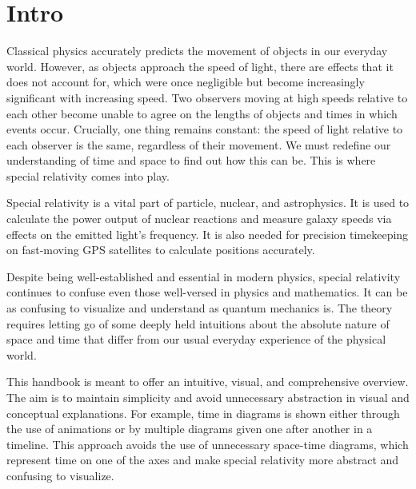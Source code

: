 \frontmatter
\chapter{Intro}

Classical physics accurately predicts the movement of objects in our everyday world. However, as objects approach the speed of light, there are effects that it does not account for, which were once negligible but become increasingly significant with increasing speed. Two observers moving at high speeds relative to each other become unable to agree on the lengths of objects and times in which events occur. Crucially, one thing remains constant: the speed of light relative to each observer is the same, regardless of their movement. We must redefine our understanding of time and space to find out how this can be. This is where special relativity comes into play.

Special relativity is a vital part of particle, nuclear, and astrophysics. It is used to calculate the power output of nuclear reactions and measure galaxy speeds via effects on the emitted light's frequency. It is also needed for precision timekeeping on fast-moving GPS satellites to calculate positions accurately.

Despite being well-established and essential in modern physics, special relativity continues to confuse even those well-versed in physics and mathematics. It can be as confusing to visualize and understand as quantum mechanics is. The theory requires letting go of some deeply held intuitions about the absolute nature of space and time that differ from our usual everyday experience of the physical world.

This handbook is meant to offer an intuitive, visual, and comprehensive overview. The aim is to maintain simplicity and avoid unnecessary abstraction in visual and conceptual explanations. For example, time in diagrams is shown either through the use of animations or by multiple diagrams given one after another in a timeline. This approach avoids the use of unnecessary space-time diagrams, which represent time on one of the axes and make special relativity more abstract and confusing to visualize.

